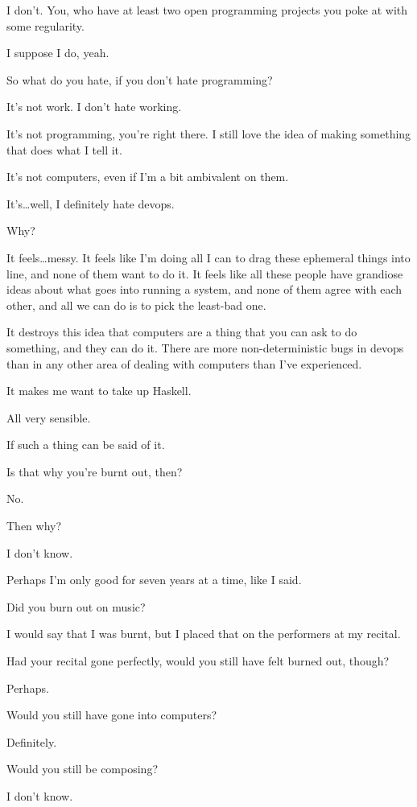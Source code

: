 \begin{paracol}{2}
\begin{leftcolumn}
\begin{ally}
I don't. You, who have at least two open programming projects you poke at with some regularity.
\end{ally}
I suppose I do, yeah.

\begin{ally}
So what do you hate, if you don't hate programming?
\end{ally}
It's not work. I don't hate working.

It's not programming, you're right there. I still love the idea of making something that does what I tell it.

It's not computers, even if I'm a bit ambivalent on them.

It's\ldots{}well, I definitely hate devops.

\begin{ally}
Why?
\end{ally}
It feels\ldots{}messy. It feels like I'm doing all I can to drag these ephemeral things into line, and none of them want to do it. It feels like all these people have grandiose ideas about what goes into running a system, and none of them agree with each other, and all we can do is to pick the least-bad one.

It destroys this idea that computers are a thing that you can ask to do something, and they can do it. There are more non-deterministic bugs in devops than in any other area of dealing with computers than I've experienced.

It makes me want to take up Haskell.

\begin{ally}
All very sensible.
\end{ally}
If such a thing can be said of it.

\begin{ally}
Is that why you're burnt out, then?
\end{ally}
No.

\begin{ally}
Then why?
\end{ally}
I don't know.

Perhaps I'm only good for seven years at a time, like I said.

\begin{ally}
Did you burn out on music?
\end{ally}
I would say that I was burnt, but I placed that on the performers at my recital.

\begin{ally}
Had your recital gone perfectly, would you still have felt burned out, though?
\end{ally}
Perhaps.

\begin{ally}
Would you still have gone into computers?
\end{ally}
Definitely.

\begin{ally}
Would you still be composing?
\end{ally}
I don't know.
\newpage
\end{leftcolumn}
\end{paracol}

